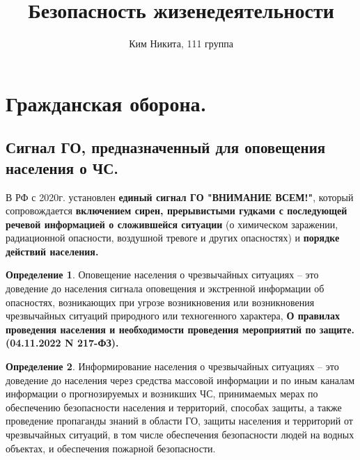 \documentclass[a4paper, 12pt]{article}
\title{\textbf{Безопасность жизенедеятельности}}
\author{Ким Никита, 111 группа}
\theoremstyle{definition}
\newtheorem*{definition}{Определение}
\begin{document}
    \fontsize{14pt}{20pt}\selectfont
    \maketitle
    \newpage
    \tableofcontents
    \fontsize{14pt}{20pt}\selectfont
    \newpage
    \section{Гражданская оборона.}
        \subsection{Сигнал ГО, предназначенный для оповещения населения о ЧС.}
        В РФ с 2020г. установлен \textbf{единый сигнал ГО "ВНИМАНИЕ ВСЕМ!"}, который сопровождается \textbf{включением сирен, прерывистыми гудками с последующей речевой информацией о сложившейся ситуации} (о химическом заражении, радиационной опасности, воздушной тревоге и других опасностях) и \textbf{порядке действий населения.}  
        \begin{definition}
            Оповещение населения о чрезвычайных ситуациях -- это доведение до населения сигнала оповещения и экстренной информации об опасностях, возникающих при угрозе возникновения или возникновения чрезвычайных ситуаций природного или техногенного характера, \textbf{О правилах проведения населения и необходимости проведения мероприятий по защите. (04.11.2022 N 217-ФЗ).} 
        \end{definition}
        \begin{definition}
            Информирование населения о чрезвычайных ситуациях -- это доведение до населения через средства массовой информации и по иным каналам информации о прогнозируемых и возникших ЧС, принимаемых мерах по обеспечению безопасности населения и территорий, способах защиты, а также проведение пропаганды знаний в области ГО, защиты населения и территорий от чрезвычайных ситуаций, в том числе обеспечения безопасности людей на водных объектах, и обеспечения пожарной безопасности.
        \end{definition}
\end{document}
